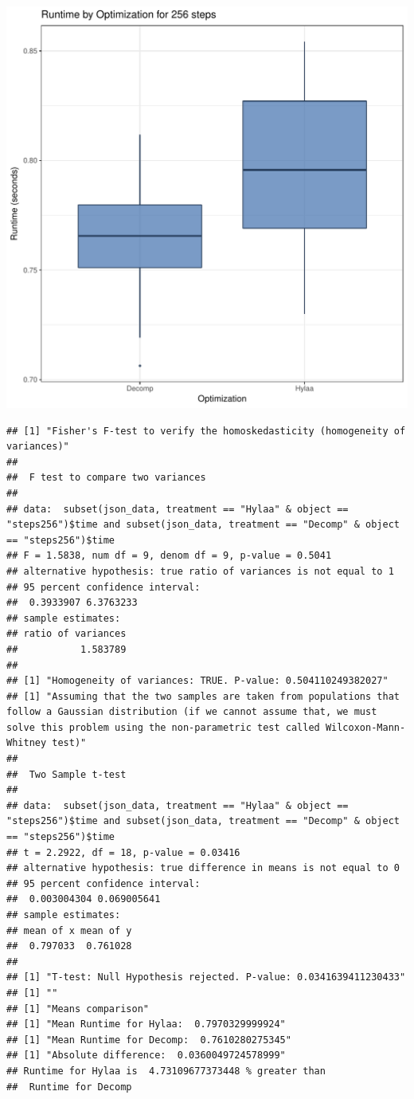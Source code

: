 \documentclass{article}\usepackage[]{graphicx}\usepackage[]{color}
\makeatletter
\def\maxwidth{ %
  \ifdim\Gin@nat@width>\linewidth
    \linewidth
  \else
    \Gin@nat@width
  \fi
}
\newenvironment{kframe}{%
 \def\at@end@of@kframe{}%
 \ifinner\ifhmode%
  \def\at@end@of@kframe{\end{minipage}}%
  \begin{minipage}{\columnwidth}%
 \fi\fi%
 \def\FrameCommand##1{\hskip\@totalleftmargin \hskip-\fboxsep
 \colorbox{shadecolor}{##1}\hskip-\fboxsep
     \hskip-\linewidth \hskip-\@totalleftmargin \hskip\columnwidth}%
 \MakeFramed {\advance\hsize-\width
   \@totalleftmargin\z@ \linewidth\hsize
   \@setminipage}}%
 {\par\unskip\endMakeFramed%
 \at@end@of@kframe}
\newenvironment{knitrout}{}{} %
\makeatother
\begin{document}
\begin{knitrout}
\color{fgcolor}
\includegraphics[width=\maxwidth]{figure/RH2_steps256-1} 
\begin{kframe}\begin{verbatim}
## [1] "Fisher's F-test to verify the homoskedasticity (homogeneity of variances)"
## 
## 	F test to compare two variances
## 
## data:  subset(json_data, treatment == "Hylaa" & object == "steps256")$time and subset(json_data, treatment == "Decomp" & object == "steps256")$time
## F = 1.5838, num df = 9, denom df = 9, p-value = 0.5041
## alternative hypothesis: true ratio of variances is not equal to 1
## 95 percent confidence interval:
##  0.3933907 6.3763233
## sample estimates:
## ratio of variances 
##           1.583789 
## 
## [1] "Homogeneity of variances: TRUE. P-value: 0.504110249382027"
## [1] "Assuming that the two samples are taken from populations that follow a Gaussian distribution (if we cannot assume that, we must solve this problem using the non-parametric test called Wilcoxon-Mann-Whitney test)"
## 
## 	Two Sample t-test
## 
## data:  subset(json_data, treatment == "Hylaa" & object == "steps256")$time and subset(json_data, treatment == "Decomp" & object == "steps256")$time
## t = 2.2922, df = 18, p-value = 0.03416
## alternative hypothesis: true difference in means is not equal to 0
## 95 percent confidence interval:
##  0.003004304 0.069005641
## sample estimates:
## mean of x mean of y 
##  0.797033  0.761028 
## 
## [1] "T-test: Null Hypothesis rejected. P-value: 0.0341639411230433"
## [1] ""
## [1] "Means comparison"
## [1] "Mean Runtime for Hylaa:  0.7970329999924"
## [1] "Mean Runtime for Decomp:  0.7610280275345"
## [1] "Absolute difference:  0.0360049724578999"
## Runtime for Hylaa is  4.73109677373448 % greater than 
##  Runtime for Decomp
\end{verbatim}
\end{kframe}
\end{knitrout}
\end{document}
